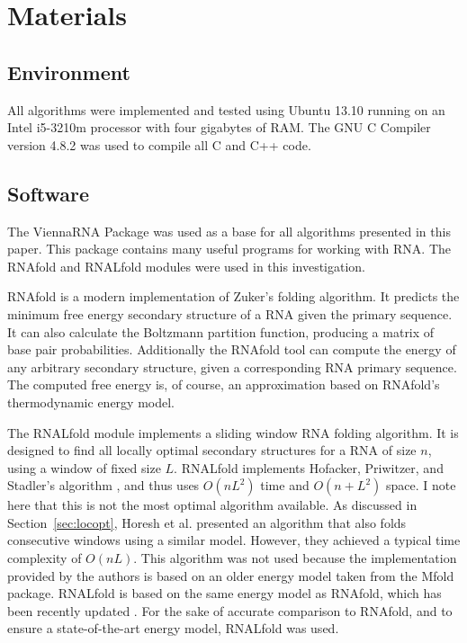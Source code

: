 \documentclass{cshonours}
\begin{document}
\section{Materials}
\subsection{Environment}
All algorithms were implemented and tested using Ubuntu 13.10 running on an Intel i5-3210m processor with four gigabytes of RAM. The GNU C Compiler version 4.8.2 was used to compile all C and C++ code. 

\subsection{Software}
The ViennaRNA Package \cite{lorenz2011viennarna} was used as a base for all algorithms presented in this paper. This package contains many useful programs for working with RNA. The RNAfold and RNALfold modules were used in this investigation. 

RNAfold is a modern implementation of Zuker's folding algorithm. It predicts the minimum free energy secondary structure of a RNA given the primary sequence. It can also calculate the Boltzmann partition function, producing a matrix of base pair probabilities. Additionally the RNAfold tool can compute the energy of any arbitrary secondary structure, given a corresponding RNA primary sequence. The computed free energy is, of course, an approximation based on RNAfold's thermodynamic energy model.

The RNALfold module implements a sliding window RNA folding algorithm. It is designed to find all locally optimal secondary structures for a RNA of size $n$, using a window of fixed size $L$. RNALfold implements Hofacker, Priwitzer, and Stadler's algorithm \cite{hofacker2004prediction}, and thus uses $O(nL^2)$ time and $O(n + L^2)$ space. I note here that this is not the most optimal algorithm available. As discussed in Section~\ref{sec:locopt}, Horesh et al. \cite{horesh2009rnaslider} presented an algorithm that also folds consecutive windows using a similar model. However, they achieved a typical time complexity of $O(nL)$. This algorithm was not used because the implementation provided by the authors is based on an older energy model taken from the Mfold \cite{zuker2003mfold} package. RNALfold is based on the same energy model as RNAfold, which has been recently updated \cite{lorenz2011viennarna}. For the sake of accurate comparison to RNAfold, and to ensure a state-of-the-art energy model, RNALfold was used.
\end{document}
